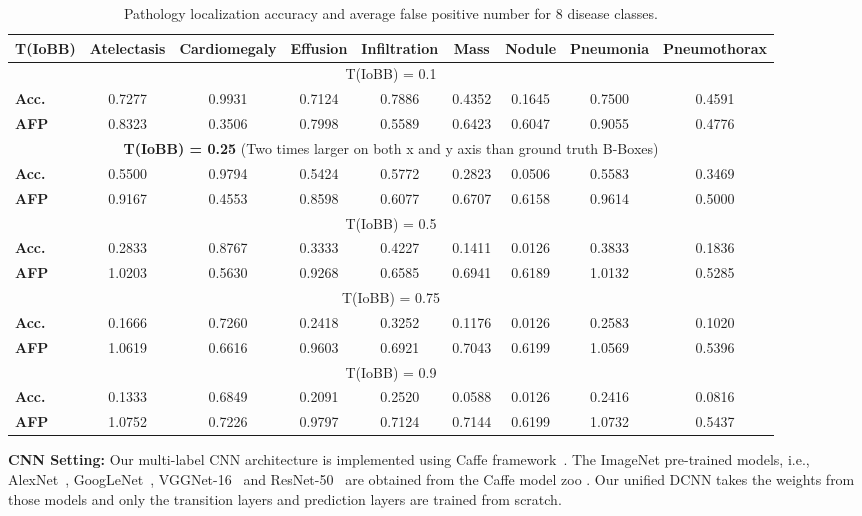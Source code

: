 \documentclass[10pt,twocolumn,letterpaper]{article}
\begin{document}
\begin{table}[t]
	\small
	\centering
	\begin{tabular}{|p{6.5em}||c|c|c|c|c|c|c|c|}
		\hline
		{\bf T(IoBB)}   & {\bf Atelectasis} & {\bf Cardiomegaly} & {\bf Effusion} & {\bf Infiltration} & {\bf Mass} & {\bf Nodule} & {\bf Pneumonia} & {\bf Pneumothorax} \\
		\hline\hline
		\multicolumn{9}{|c|}{T(IoBB) = 0.1}\\
		\hline
		{\bf Acc.}   & 0.7277&0.9931&0.7124&0.7886&0.4352&0.1645&0.7500&0.4591\\
		\hline
		{\bf AFP}    & 0.8323&0.3506&0.7998&0.5589&0.6423&0.6047&0.9055&0.4776\\
		\hline
		\multicolumn{9}{|c|}{\textbf{T(IoBB) = 0.25} (Two times larger on both x and y axis than ground truth B-Boxes)}\\
		\hline
		{\bf Acc.}   & 0.5500&0.9794&0.5424&0.5772&0.2823&0.0506&0.5583&0.3469\\
		\hline
		{\bf AFP}   & 0.9167&0.4553&0.8598&0.6077&0.6707&0.6158&0.9614&0.5000\\
		\hline
		\multicolumn{9}{|c|}{T(IoBB) = 0.5}\\
		\hline
		{\bf Acc.}   & 0.2833&0.8767&0.3333&0.4227&0.1411&0.0126&0.3833&0.1836\\
		\hline
		{\bf AFP}   & 1.0203&0.5630&0.9268&0.6585&0.6941&0.6189&1.0132&0.5285\\
		\hline
		\multicolumn{9}{|c|}{T(IoBB) = 0.75}\\
		\hline		
		{\bf Acc.}   & 0.1666&0.7260&0.2418&0.3252&0.1176&0.0126&0.2583&0.1020\\
		\hline
		{\bf AFP}   & 1.0619&0.6616&0.9603&0.6921&0.7043&0.6199&1.0569&0.5396\\
		\hline
		\multicolumn{9}{|c|}{T(IoBB) = 0.9} \\
		\hline
		{\bf Acc.}   & 0.1333&0.6849&0.2091&0.2520&0.0588&0.0126&0.2416&0.0816\\
		\hline
		{\bf AFP}   & 1.0752&0.7226&0.9797&0.7124&0.7144&0.6199&1.0732&0.5437\\
		\hline
	\end{tabular}\label{tab:IoBB}
	\caption{Pathology localization accuracy and average false positive number for 8 disease classes.}
\end{table}

{\bf CNN Setting:}
Our multi-label CNN architecture is implemented using Caffe framework~\cite{jia2014caffe}. The ImageNet pre-trained models, i.e., AlexNet~\cite{krizhevsky2012imagenet}, GoogLeNet~\cite{szegedy2015going}, VGGNet-16~\cite{simonyan2014very} and ResNet-50~\cite{He2015} are obtained from the Caffe model zoo%
. Our unified DCNN takes the weights from those models and only the transition layers and prediction layers are trained from scratch.
\end{document}
